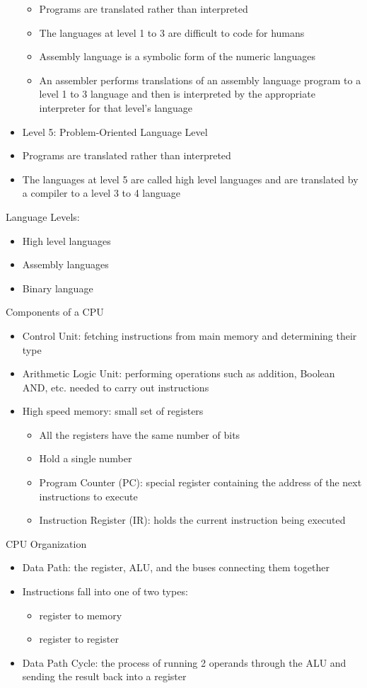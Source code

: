\documentclass[12pt]{article}
\begin{document}
\begin{itemize}
\begin{itemize}
\item Programs are translated rather than interpreted 
\item The languages at level 1 to 3 are difficult to code for humans 
\item Assembly language is a symbolic form of the numeric languages 
\item An assembler performs translations of an assembly language program to a level 1 to 3 language and then is interpreted by the appropriate interpreter for that level's language 
\end{itemize} 
\item Level 5: Problem-Oriented Language Level 
\item Programs are translated rather than interpreted 
\item The languages at level 5 are called high level languages and are translated by a compiler to a level 3 to 4 language 
\end{itemize}
Language Levels: \begin{itemize} 
\item High level languages 
\item Assembly languages 
\item Binary language \end{itemize} 
Components of a CPU \begin{itemize} 
\item Control Unit: fetching instructions from main memory and determining their type 
\item Arithmetic Logic Unit: performing operations such as addition, Boolean AND, etc. needed to carry out instructions 
\item High speed memory: small set of registers \begin{itemize} 
\item All the registers have the same number of bits 
\item Hold a single number 
\item Program Counter (PC): special register containing the address of the next instructions to execute 
\item Instruction Register (IR): holds the current instruction being executed 
\end{itemize} \end{itemize} 
CPU Organization \begin{itemize} 
\item Data Path: the register, ALU, and the buses connecting them together 
\item Instructions fall into one of two types: \begin{itemize} 
\item register to memory \item register to register \end{itemize} 
\item Data Path Cycle: the process of running 2 operands through the ALU and sending the result back into a register \end{itemize} 
\end{document}
